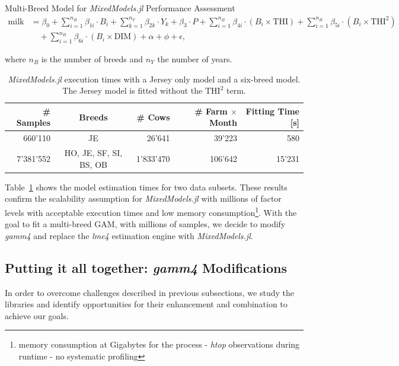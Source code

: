 \begin{defi} Multi-Breed Model for \textit{MixedModels.jl} Performance Assessment
\begin{equation}\label{eq:lmm_julia}
\begin{aligned}
\text{milk} &= \beta_0 + \sum_{i=1}^{n_B} \beta_{1i} \cdot B_i + \sum_{k=1}^{n_Y} \beta_{2k} \cdot Y_k + \beta_3 \cdot P + \sum_{i=1}^{n_B} \beta_{4i} \cdot (B_i \times \text{THI}) + \sum_{i=1}^{n_B} \beta_{5i} \cdot (B_i \times \text{THI}^2) \\
&\quad + \sum_{i=1}^{n_B} \beta_{6i} \cdot (B_i \times \text{DIM})  + \alpha + \phi + \epsilon,
\end{aligned}
\end{equation}
\end{defi}

where $n_B$ is the number of breeds and $n_Y$ the number of years.

\begin{table}[H]
\centering
\begin{tabular}{r|c|r|r|r}
\textbf{\# Samples} & \textbf{Breeds} & \textbf{\# Cows} & \textbf{\# Farm $\times$ Month} & \textbf{Fitting Time [s]} \\
\hline
\hline
660'110 & JE & 26'641 & 39'223 & 580\\
7'381'552 & HO, JE, SF, SI, BS, OB & 1'833'470 & 106'642 & 15'231\\
\end{tabular}
\captionsetup{width=0.95\linewidth}
\caption{\textit{MixedModels.jl} execution times with a Jersey only model and a six-breed model. The Jersey model is fitted without the $\text{THI}^2$ term.}\label{table:mixedmodeljl_performance}
\end{table}

Table~\ref{table:mixedmodeljl_performance} shows the model estimation times for two data subsets. These results confirm the scalability assumption for \textit{MixedModels.jl} with millions of factor levels with acceptable execution times and low memory consumption\footnote{memory consumption at Gigabytes for the process - \textit{htop} observations during runtime - no systematic profiling}. With the goal to fit a multi-breed GAM, with millions of samples, we decide to modify \textit{gamm4} and replace the \textit{lme4} estimation engine with \textit{MixedModels.jl}.

\subsection{Putting it all together: \textit{gamm4} Modifications}\label{sec:gamm4_modifications}
In order to overcome challenges described in previous subsections, we study the libraries and identify opportunities for their enhancement and combination to achieve our goals.

